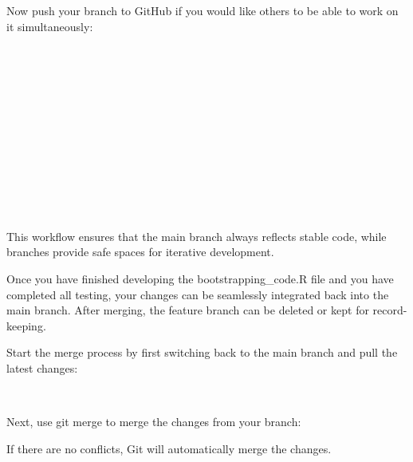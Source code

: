 \newpage
\noindent Now push your branch to GitHub if you would like others to be able to work on it simultaneously:
\begin{terminal}
\\
\\
\\
\\
\\
\\
\\
\\
\\
\\
\\
\end{terminal}
This workflow ensures that the main branch always reflects stable code, while branches provide safe spaces for iterative development. 

Once you have finished developing the bootstrapping\_code.R file and you have completed all testing, your changes can be seamlessly integrated back into the main branch. After merging, the feature branch can be deleted or kept for record-keeping.

Start the merge process by first switching back to the main branch and pull the latest changes:
\begin{terminal}
\\
\end{terminal}

Next, use git merge to merge the changes from your branch:
\begin{terminal}
\end{terminal}
If there are no conflicts, Git will automatically merge the changes.

